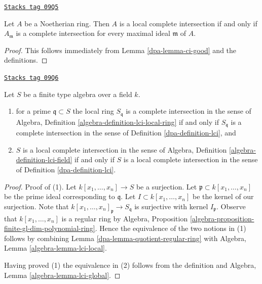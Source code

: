 \begin{lemma}
\label{dpa-lemma-check-lci-at-maximal-ideals}
\href{https://stacks.math.columbia.edu/tag/09Q5}{\texttt{Stacks tag 09Q5}}

Let $A$ be a Noetherian ring. Then $A$ is a local complete intersection
if and only if $A_\mathfrak m$ is a complete intersection for every
maximal ideal $\mathfrak m$ of $A$.
\end{lemma}

\begin{proof}

This follows immediately from Lemma \ref{dpa-lemma-ci-good} and the definitions.
\end{proof}

\begin{lemma}
\label{dpa-lemma-check-lci-agrees}
\href{https://stacks.math.columbia.edu/tag/09Q6}{\texttt{Stacks tag 09Q6}}

Let $S$ be a finite type algebra over a field $k$.
\begin{enumerate}
\item for a prime $\mathfrak q \subset S$ the local ring $S_\mathfrak q$
is a complete intersection in the sense of
Algebra, Definition \ref{algebra-definition-lci-local-ring}
if and only if $S_\mathfrak q$ is a complete
intersection in the sense of Definition \ref{dpa-definition-lci}, and
\item $S$ is a local complete intersection in the sense of
Algebra, Definition \ref{algebra-definition-lci-field}
if and only if $S$ is a local complete
intersection in the sense of Definition \ref{dpa-definition-lci}.
\end{enumerate}
\end{lemma}

\begin{proof}

Proof of (1). Let $k[x_1, \ldots, x_n] \to S$ be a surjection.
Let $\mathfrak p \subset k[x_1, \ldots, x_n]$ be the prime ideal
corresponding to $\mathfrak q$.
Let $I \subset k[x_1, \ldots, x_n]$ be the kernel of our surjection.
Note that $k[x_1, \ldots, x_n]_\mathfrak p \to S_\mathfrak q$
is surjective with kernel $I_\mathfrak p$. Observe that
$k[x_1, \ldots, x_n]$ is a regular ring by
Algebra, Proposition \ref{algebra-proposition-finite-gl-dim-polynomial-ring}.
Hence the equivalence of the two notions in (1) follows by
combining
Lemma \ref{dpa-lemma-quotient-regular-ring}
with Algebra, Lemma \ref{algebra-lemma-lci-local}.

\medskip\noindent
Having proved (1) the equivalence in (2) follows from the
definition and Algebra, Lemma \ref{algebra-lemma-lci-global}.
\end{proof}

